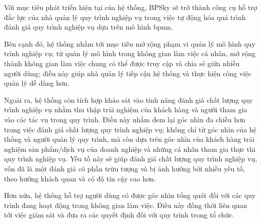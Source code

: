 
Với mục tiêu phát triển hiện tại của hệ thống, BPSky sẽ trở thành công cụ hỗ trợ đắc lực của nhà quản lý quy trình nghiệp vụ trong việc tự động hóa quá trình đánh giá quy trình nghiệp vụ dựa trên mô hình \acrfull*{bpmn}.

Bên cạnh đó, hệ thống nhắm tới mục tiêu mở rộng phạm vi quản lý mô hình quy trình nghiệp vụ; từ quản lý mô hình trong không gian làm việc cá nhân, mở rộng thành không gian làm việc chung có thể được truy cập và chia sẻ giữa nhiều người dùng; điều này giúp nhà quản lý tiếp cận hệ thống và thực hiện công việc quản lý dễ dàng hơn.

Ngoài ra, hệ thống còn tích hợp khảo sát vào tính năng đánh giá chất lượng quy trình nghiệp vụ nhằm thu thập trải nghiệm của khách hàng và người tham gia vào các tác vụ trong quy trình. Điều này nhằm đem lại góc nhìn đa chiều hơn trong việc đánh giá chất lượng quy trình nghiệp vụ; không chỉ từ góc nhìn của hệ thống và người quản lý quy trình, mà còn dựa trên góc nhìn của khách hàng trải nghiệm sản phẩm/dịch vụ của doanh nghiệp và những cá nhân tham gia thực thi quy trình nghiệp vụ. Yếu tố này sẽ giúp đánh giá chất lượng quy trình nghiệp vụ, vốn đã là một đánh giá có phần trừu tượng và bị ảnh hưởng bởi nhiều yếu tố, theo hướng khách quan và có độ tin cậy cao hơn.

Hơn nữa, hệ thống hỗ trợ người dùng có được góc nhìn tổng quát đối với các quy trình đang hoạt động trong không gian làm việc. Điều này đồng thời liên quan tới việc giám sát và đưa ra các quyết định đối với quy trình trong tổ chức.